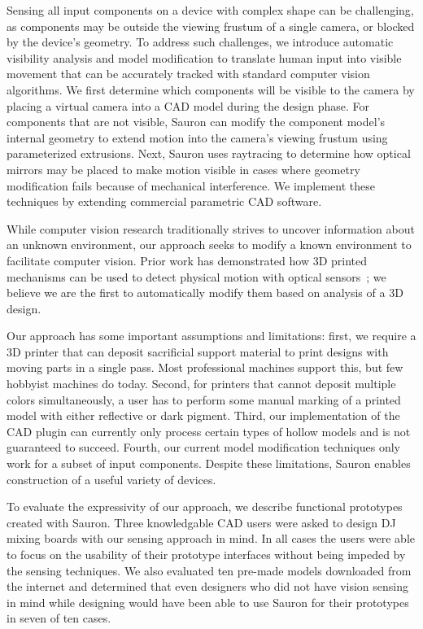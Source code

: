 Sensing all input components on a device with complex shape can be challenging, as components may be outside the viewing frustum of a single camera, or blocked by the device's geometry. To address such challenges, we introduce automatic visibility analysis and model modification 
to translate human input into visible movement that can be accurately tracked with standard computer vision algorithms. We first determine which components will be visible to the camera by placing a virtual camera into a CAD model during the design phase. For components that are not visible, Sauron can modify the component model's internal geometry to extend motion into the camera's viewing frustum using parameterized extrusions. Next, Sauron uses raytracing to determine how optical mirrors may be placed to make motion visible in cases where geometry modification fails because of mechanical interference. We implement these techniques by extending commercial parametric CAD software.

While computer vision research traditionally strives to uncover information about an unknown environment, our approach seeks to modify a known environment to facilitate computer vision. Prior work has demonstrated how 3D printed mechanisms can be used to detect physical motion with optical sensors~\cite{willis-printedoptics}; we believe we are the first to automatically modify them based on analysis of a 3D design.

Our approach has some important assumptions and limitations: first, we require a 3D printer that can deposit sacrificial support material to print designs with moving parts in a single pass. Most professional machines support this, but few hobbyist machines do today. Second, for printers that cannot deposit multiple colors simultaneously, a user has to perform some manual marking of a printed model with either reflective or dark pigment. Third, our implementation of the CAD plugin can currently only process certain types of hollow models and is not guaranteed to succeed. Fourth, our current model modification techniques only work for a subset of input components. Despite these limitations, Sauron enables construction of a useful variety of devices.

To evaluate the expressivity of our approach, we describe functional prototypes created with Sauron. 
Three knowledgable CAD users were asked to %
design DJ mixing boards with our sensing approach in mind. In all cases the users were able to focus on the usability of their prototype interfaces without being impeded by the sensing techniques. We also evaluated ten pre-made models downloaded from the internet and determined that even designers who did not have vision sensing in mind while designing would have been able to use Sauron for their prototypes in seven of ten cases.

